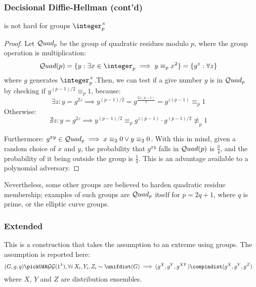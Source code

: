 
\subsubsection{Decisional Diffie-Hellman (cont'd)}

\begin{claim}
    \ddh{} is not hard for groups $\integer_p^\times$
\end{claim}

\begin{proof}
    Let $\mathcal{Q}uad_p$ be the group of quadratic residues modulo $p$, where the group operation is multiplication:
    \[
        \quadres(p) = \{y : \exists x \in \integer_p \implies y \equiv_p x^2\} = \{g^z : \forall z\}
    \]
    where $g$ generates $\integer_p^\times$.Then, we can test if a give number $y$ is in $\mathcal{Q}uad_p$ by checking if $y^{(p-1)/2} \equiv_p 1$, because:
    \[
        \exists z : y = g^{2z} \implies y^{(p-1)/2} = g^{\frac{2z(p-1)}{2}} = g^{z(p-1)} \equiv_p 1
    \]
    Otherwise: %
    \[
        \nexists z : y = g^{2z} \implies y^{(p-1)/2} \equiv_p g^{z(p-1)} \cdot g^{(p-1)/2} \not\equiv_p 1
    \]

    Furthermore: $g^{xy} \in \mathcal{Q}uad_p \implies x \equiv_2 0 \vee y \equiv_2 0$. With this in mind, given a random choice of $x$ and $y$, the probability that $g^{xy}$ falls in $\mathcal{Q}uad(p)$ is $\frac{3}{4}$, and the probability of it being outside the group is $\frac{1}{4}$. This is an advantage available to a polynomial adversary.
\end{proof}

Nevertheless, some other groups are believed to harden quadratic residue membership; examples of such groups are $\mathcal{Q}uad_p$ itself for $p = 2q + 1$, where $q$ is prime, or the elliptic curve groups.

\subsubsection{Extended \ddh}

This is a construction that takes the \ddh{} assumption to an extreme using groups. The \ddh{} assumption is reported here:
\[
    (G, g, q) \pickUAR \groupgen(1^\lambda), \forall i\: X_i, Y_i, Z_i \sim \unifdist(G) \implies (g^X, g^Y, g^{XY}) \compindist (g^X, g^Y, g^Z)
\]
where $X$, $Y$ and $Z$ are distribution ensembles.

